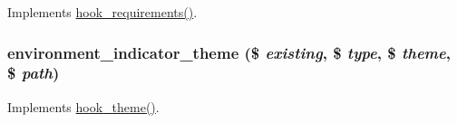 \label{environment__indicator_8module_ac2df292851fe032e8c1b8190b662efbb}
Implements \hyperlink{group__hooks_ga3cff06c700ccb873cfce71fc378e7675}{hook\_\-requirements()}. \hypertarget{environment__indicator_8module_a66c8bc2c0f18f3e23b56a62ef94c1b99}{
\subsubsection[{environment\_\-indicator\_\-theme}]{\setlength{\rightskip}{0pt plus 5cm}environment\_\-indicator\_\-theme (\$ {\em existing}, \/  \$ {\em type}, \/  \$ {\em theme}, \/  \$ {\em path})}}
\label{environment__indicator_8module_a66c8bc2c0f18f3e23b56a62ef94c1b99}
Implements \hyperlink{group__hooks_ga013ccb45c7aaab1c16cf9691428c910d}{hook\_\-theme()}. 